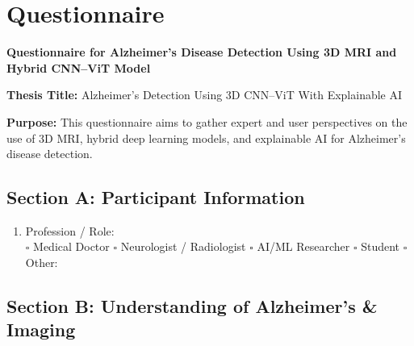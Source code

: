\chapter{Questionnaire}

\begin{center}
\textbf{\Large Questionnaire for Alzheimer’s Disease Detection Using 3D MRI and Hybrid CNN--ViT Model}
\end{center}

\vspace{0.3cm}

\noindent\textbf{Thesis Title:} Alzheimer's Detection Using 3D CNN--ViT With Explainable AI

\noindent\textbf{Purpose:}  
This questionnaire aims to gather expert and user perspectives on the use of 3D MRI, hybrid deep learning models, and explainable AI for Alzheimer’s disease detection.

\vspace{0.5cm}

\section*{Section A: Participant Information}

\begin{enumerate}
\item Profession / Role:\\
$\square$ Medical Doctor \hspace{0.3cm}
$\square$ Neurologist / Radiologist \hspace{0.3cm}
$\square$ AI/ML Researcher \hspace{0.3cm}
$\square$ Student \hspace{0.3cm}
$\square$ Other: \underline{\hspace{3cm}}

\end{enumerate}


\section*{Section B: Understanding of Alzheimer’s \& Imaging}


